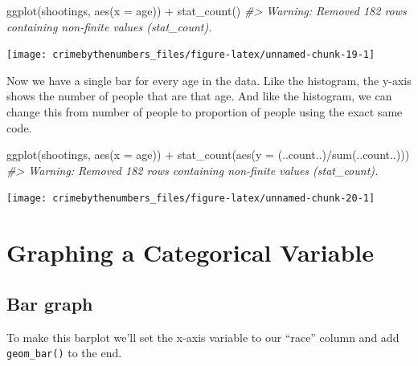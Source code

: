 \documentclass[
]{krantz}
\makeatletter
\newenvironment{Shaded}{\begin{snugshade}}{\end{snugshade}}
\newcommand{\AttributeTok}[1]{\textcolor[rgb]{0.61,0.61,0.61}{#1}}
\newcommand{\CommentTok}[1]{\textcolor[rgb]{0.37,0.37,0.37}{\textit{#1}}}
\newcommand{\FunctionTok}[1]{\textcolor[rgb]{0,0,0}{#1}}
\newcommand{\NormalTok}[1]{#1}
\newcommand{\SpecialCharTok}[1]{\textcolor[rgb]{0,0,0}{#1}}
\newenvironment{kframe}{%
\medskip{}
\setlength{\fboxsep}{.8em}
 \def\at@end@of@kframe{}%
 \ifinner\ifhmode%
  \def\at@end@of@kframe{\end{minipage}}%
  \begin{minipage}{\columnwidth}%
 \fi\fi%
 \def\FrameCommand##1{\hskip\@totalleftmargin \hskip-\fboxsep
 \colorbox{shadecolor}{##1}\hskip-\fboxsep
     \hskip-\linewidth \hskip-\@totalleftmargin \hskip\columnwidth}%
 \MakeFramed {\advance\hsize-\width
   \@totalleftmargin\z@ \linewidth\hsize
   \@setminipage}}%
 {\par\unskip\endMakeFramed%
 \at@end@of@kframe}
\renewenvironment{Shaded}{\begin{kframe}}{\end{kframe}}
\makeatother
\begin{document}
\begin{Shaded}
\begin{Highlighting}[]
\FunctionTok{ggplot}\NormalTok{(shootings, }\FunctionTok{aes}\NormalTok{(}\AttributeTok{x =}\NormalTok{ age)) }\SpecialCharTok{+} 
  \FunctionTok{stat\_count}\NormalTok{()}
\CommentTok{\#\textgreater{} Warning: Removed 182 rows containing non{-}finite values (stat\_count).}
\end{Highlighting}
\end{Shaded}

\begin{center}\texttt{[image: crimebythenumbers\_files/figure-latex/unnamed-chunk-19-1]} \end{center}

Now we have a single bar for every age in the data. Like the histogram, the y-axis shows the number of people that are that age. And like the histogram, we can change this from number of people to proportion of people using the exact same code.

\begin{Shaded}
\begin{Highlighting}[]
\FunctionTok{ggplot}\NormalTok{(shootings, }\FunctionTok{aes}\NormalTok{(}\AttributeTok{x =}\NormalTok{ age)) }\SpecialCharTok{+} 
  \FunctionTok{stat\_count}\NormalTok{(}\FunctionTok{aes}\NormalTok{(}\AttributeTok{y =}\NormalTok{ (..count..)}\SpecialCharTok{/}\FunctionTok{sum}\NormalTok{(..count..)))}
\CommentTok{\#\textgreater{} Warning: Removed 182 rows containing non{-}finite values (stat\_count).}
\end{Highlighting}
\end{Shaded}

\begin{center}\texttt{[image: crimebythenumbers\_files/figure-latex/unnamed-chunk-20-1]} \end{center}

\hypertarget{graphing-a-categorical-variable}{%
\section{Graphing a Categorical Variable}\label{graphing-a-categorical-variable}}

\hypertarget{bar-graph}{%
\subsection{Bar graph}\label{bar-graph}}

To make this barplot we'll set the x-axis variable to our ``race'' column and add \texttt{geom\_bar()} to the end.
\end{document}
